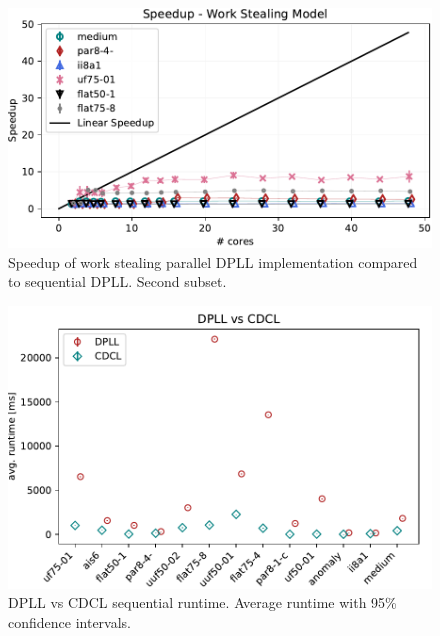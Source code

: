 \documentclass[letterpaper]{article}
\begin{document}
\begin{figure}[h]
    \centering
    \includegraphics[width=\columnwidth]{figures/scaling_stealing_non_subset_dpll_scaling_tar.pdf}
    \caption{Speedup of work stealing parallel DPLL implementation compared to sequential DPLL.
    Second subset.}
    \label{fig:dpll_stealing_speedup_non}
\end{figure}

\begin{figure}[h]
    \centering
    \includegraphics[width=\columnwidth]{figures/dpll_vs_cdcl.pdf}
    \caption{DPLL vs CDCL sequential runtime. Average runtime with 95\% confidence intervals.}
    \label{fig:dpll_stealing_speedup_non}
\end{figure}
\end{document}
